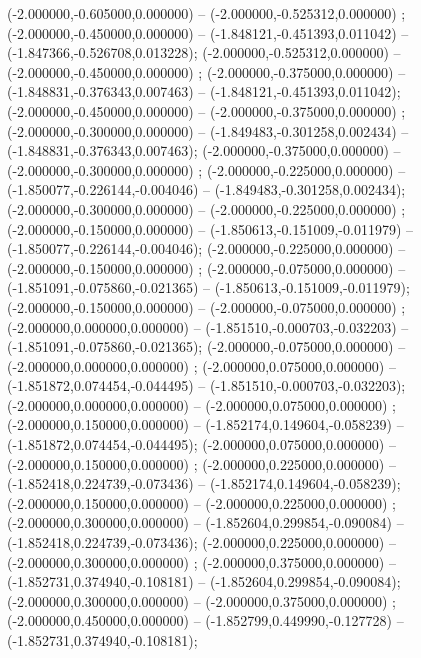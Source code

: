  (-2.000000,-0.605000,0.000000) -- (-2.000000,-0.525312,0.000000) ;
 (-2.000000,-0.450000,0.000000) -- (-1.848121,-0.451393,0.011042) -- (-1.847366,-0.526708,0.013228);
 (-2.000000,-0.525312,0.000000) -- (-2.000000,-0.450000,0.000000) ;
 (-2.000000,-0.375000,0.000000) -- (-1.848831,-0.376343,0.007463) -- (-1.848121,-0.451393,0.011042);
 (-2.000000,-0.450000,0.000000) -- (-2.000000,-0.375000,0.000000) ;
 (-2.000000,-0.300000,0.000000) -- (-1.849483,-0.301258,0.002434) -- (-1.848831,-0.376343,0.007463);
 (-2.000000,-0.375000,0.000000) -- (-2.000000,-0.300000,0.000000) ;
 (-2.000000,-0.225000,0.000000) -- (-1.850077,-0.226144,-0.004046) -- (-1.849483,-0.301258,0.002434);
 (-2.000000,-0.300000,0.000000) -- (-2.000000,-0.225000,0.000000) ;
 (-2.000000,-0.150000,0.000000) -- (-1.850613,-0.151009,-0.011979) -- (-1.850077,-0.226144,-0.004046);
 (-2.000000,-0.225000,0.000000) -- (-2.000000,-0.150000,0.000000) ;
 (-2.000000,-0.075000,0.000000) -- (-1.851091,-0.075860,-0.021365) -- (-1.850613,-0.151009,-0.011979);
 (-2.000000,-0.150000,0.000000) -- (-2.000000,-0.075000,0.000000) ;
 (-2.000000,0.000000,0.000000) -- (-1.851510,-0.000703,-0.032203) -- (-1.851091,-0.075860,-0.021365);
 (-2.000000,-0.075000,0.000000) -- (-2.000000,0.000000,0.000000) ;
 (-2.000000,0.075000,0.000000) -- (-1.851872,0.074454,-0.044495) -- (-1.851510,-0.000703,-0.032203);
 (-2.000000,0.000000,0.000000) -- (-2.000000,0.075000,0.000000) ;
 (-2.000000,0.150000,0.000000) -- (-1.852174,0.149604,-0.058239) -- (-1.851872,0.074454,-0.044495);
 (-2.000000,0.075000,0.000000) -- (-2.000000,0.150000,0.000000) ;
 (-2.000000,0.225000,0.000000) -- (-1.852418,0.224739,-0.073436) -- (-1.852174,0.149604,-0.058239);
 (-2.000000,0.150000,0.000000) -- (-2.000000,0.225000,0.000000) ;
 (-2.000000,0.300000,0.000000) -- (-1.852604,0.299854,-0.090084) -- (-1.852418,0.224739,-0.073436);
 (-2.000000,0.225000,0.000000) -- (-2.000000,0.300000,0.000000) ;
 (-2.000000,0.375000,0.000000) -- (-1.852731,0.374940,-0.108181) -- (-1.852604,0.299854,-0.090084);
 (-2.000000,0.300000,0.000000) -- (-2.000000,0.375000,0.000000) ;
 (-2.000000,0.450000,0.000000) -- (-1.852799,0.449990,-0.127728) -- (-1.852731,0.374940,-0.108181);
